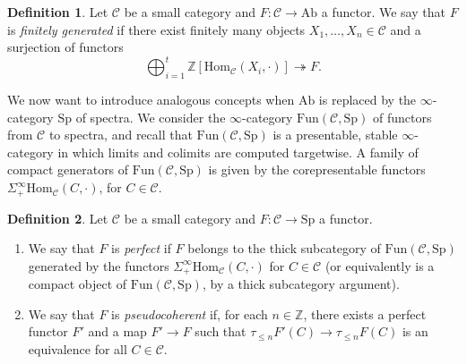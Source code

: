 \documentclass{amsart}
\renewcommand{\hom}{\mathrm{Hom}}
\newcommand{\Sp}{\mathrm{Sp}}
\newcommand{\fun}{\mathrm{Fun}}
\theoremstyle{definition}
\newtheorem{definition}{Definition}[section]
\begin{document}
\begin{definition} 
Let $\mathcal{C}$ be a small category and $F: \mathcal{C} \to \mathrm{Ab}$ a functor.
We say that $F$ is \emph{finitely generated} if there exist finitely many
objects
$X_1, \dots, X_n \in \mathcal{C}$ and a surjection 
of functors
\begin{equation} \label{fingenfun} \bigoplus_{i=1}^t \mathbb{Z}[\hom_{\mathcal{C}}(X_i, \cdot)]
\twoheadrightarrow F. \end{equation}
\end{definition} 

We now want to introduce analogous concepts when $\mathrm{Ab}$ is replaced by
the $\infty$-category $\Sp$ of spectra. 
We consider the $\infty$-category $\fun(\mathcal{C}, \Sp)$ of
functors from $\mathcal{C}$ to spectra, and recall that
$\fun(\mathcal{C}, \Sp)$ is a 
presentable, stable $\infty$-category in which limits and colimits are computed
targetwise. A family of compact generators of $\fun(\mathcal{C}, \Sp)$ is given by the
corepresentable functors $\Sigma^\infty_+ \mathrm{Hom}_{\mathcal{C}}(C, \cdot)$, for $C \in
\mathcal{C}$. 


\begin{definition} 
Let $\mathcal{C}$ be a small category and $F: \mathcal{C} \to \Sp$ a functor.
\begin{enumerate}
\item  
We say that $F$ is \emph{perfect} if $F$ belongs to the thick subcategory of $\fun(\mathcal C,\Sp)$ generated by the functors $\Sigma^\infty_+ \hom_{\mathcal{C}}(C, \cdot)$ for $C
\in \mathcal{C}$ (or equivalently is  a compact object of $\fun(\mathcal{C},
\Sp)$, by a thick subcategory argument).
\item
We say that $F$ is \emph{pseudocoherent} if, for each $n \in \mathbb{Z}$, there exists a
perfect functor $F'$ and  a map $F' \to F$ such that $\tau_{\le n}F'(C)\to\tau_{\le n}F(C)$ is an equivalence for all $C\in \mathcal C$.
\end{enumerate}
\end{definition} 
\end{document}
